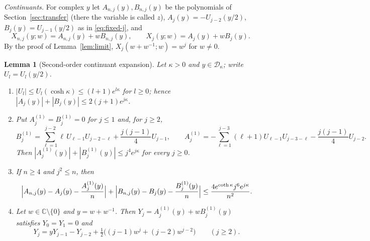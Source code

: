 \documentclass[11pt]{amsart}
\newtheorem{lemma}[theorem]{Lemma}
\theoremstyle{definition}
\theoremstyle{remark}
\numberwithin{equation}{section}
\newcommand{\C}{\mathbb{C}}
\begin{document}
\emph{Continuants.} For complex $y$ let $A_{n,j}(y),B_{n,j}(y)$ be the polynomials of Section~\ref{sec:transfer}
(there the variable is called $z$), $A_j(y)=-U_{j-2}(y/2)$, $B_j(y)=U_{j-1}(y/2)$ as in \eqref{eq:fixed-j}, and
\[
X_{n,j}(y;w)=A_{n,j}(y)+wB_{n,j}(y),\qquad X_j(y;w)=A_j(y)+wB_j(y).
\]
By the proof of Lemma~\ref{lem:limit}, $X_j(w+w^{-1};w)=w^j$ for $w\ne0$.

\begin{lemma}[Second-order continuant expansion]\label{lem:secondorder}
Let $\kappa>0$ and $y\in\mathcal D_\kappa$; write $U_l=U_l(y/2)$.
\begin{enumerate}
\item[(a)] $|U_l|\le U_l(\cosh\kappa)\le(l+1)e^{l\kappa}$ for $l\ge0$; hence $|A_j(y)|+|B_j(y)|\le2(j+1)e^{j\kappa}$.
\item[(b)] Put $A^{(1)}_j=B^{(1)}_j=0$ for $j\le1$ and, for $j\ge2$,
\[
B^{(1)}_j=\sum_{\ell=1}^{j-2}\ell\,U_{\ell-1}U_{j-2-\ell}+\frac{j(j-1)}4U_{j-1},\qquad
A^{(1)}_j=-\sum_{\ell=1}^{j-3}(\ell+1)U_{\ell-1}U_{j-3-\ell}-\frac{j(j-1)}4U_{j-2}.
\]
Then $|A^{(1)}_j(y)|+|B^{(1)}_j(y)|\le j^4e^{j\kappa}$ for every $j\ge0$.
\item[(c)] If $n\ge4$ and $j^2\le n$, then
\[
\Bigl|A_{n,j}(y)-A_j(y)-\frac{A^{(1)}_j(y)}n\Bigr|+\Bigl|B_{n,j}(y)-B_j(y)-\frac{B^{(1)}_j(y)}n\Bigr|
\le\frac{4e^{\coth\kappa}j^6e^{j\kappa}}{n^2}.
\]
\item[(d)] Let $w\in\C\setminus\{0\}$ and $y=w+w^{-1}$. Then $Y_j=A^{(1)}_j(y)+wB^{(1)}_j(y)$ satisfies $Y_0=Y_1=0$ and
\[
Y_j=yY_{j-1}-Y_{j-2}+\tfrac12\bigl((j-1)w^j+(j-2)w^{j-2}\bigr)\qquad(j\ge2).
\]
\end{enumerate}
\end{lemma}
\end{document}
